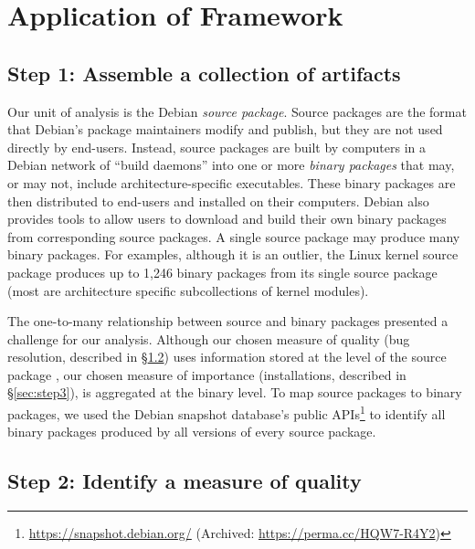 \documentclass[10pt,conference]{IEEEtran}\usepackage[]{graphicx}\usepackage[usenames,dvipsnames]{color}
\begin{document}
\section{Application of Framework}
\label{sec:application}


\subsection{Step 1: Assemble a collection of artifacts}
\label{sec:step1}

Our unit of analysis is the Debian \textit{source package}. Source packages are the format that Debian's package maintainers modify and publish, but they are not used directly by end-users. Instead, source packages are built by computers in a Debian network of ``build daemons'' into one or more \textit{binary packages} that may, or may not, include architecture-specific executables. These binary packages are then distributed to end-users and installed on their computers. Debian also provides tools to allow users to download and build their own binary packages from corresponding source packages. A single source package may produce many binary packages. For examples, although it is an outlier, the Linux kernel source package produces up to 1,246 binary packages from its single source package (most are architecture specific subcollections of kernel modules).

The one-to-many relationship between source and binary packages presented a challenge for our analysis. Although our chosen measure of quality (bug resolution, described in  §\ref{sec:step2}) uses information stored at the level of the source package \cite{davies_perspectives_2010}, our chosen measure of importance (installations, described in  §\ref{sec:step3}), is aggregated at the binary level.
To map source packages to binary packages, we used the Debian snapshot database's public APIs\footnote{\url{https://snapshot.debian.org/} (Archived: \url{https://perma.cc/HQW7-R4Y2})} to identify all binary packages produced by all versions of every source package. 

\subsection{Step 2: Identify a measure of quality}
\label{sec:step2}
\end{document}
